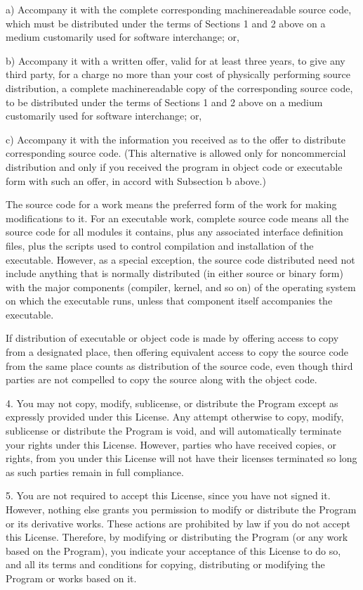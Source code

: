 \documentclass[letterpaper,10pt,english]{sphinxmanual}
\begin{document}
\begin{sphinxVerbatim}[commandchars=\\\{\}]
    a) Accompany it with the complete corresponding machine\PYGZhy{}readable
    source code, which must be distributed under the terms of Sections
    1 and 2 above on a medium customarily used for software interchange; or,

    b) Accompany it with a written offer, valid for at least three
    years, to give any third party, for a charge no more than your
    cost of physically performing source distribution, a complete
    machine\PYGZhy{}readable copy of the corresponding source code, to be
    distributed under the terms of Sections 1 and 2 above on a medium
    customarily used for software interchange; or,

    c) Accompany it with the information you received as to the offer
    to distribute corresponding source code.  (This alternative is
    allowed only for noncommercial distribution and only if you
    received the program in object code or executable form with such
    an offer, in accord with Subsection b above.)

The source code for a work means the preferred form of the work for
making modifications to it.  For an executable work, complete source
code means all the source code for all modules it contains, plus any
associated interface definition files, plus the scripts used to
control compilation and installation of the executable.  However, as a
special exception, the source code distributed need not include
anything that is normally distributed (in either source or binary
form) with the major components (compiler, kernel, and so on) of the
operating system on which the executable runs, unless that component
itself accompanies the executable.

If distribution of executable or object code is made by offering
access to copy from a designated place, then offering equivalent
access to copy the source code from the same place counts as
distribution of the source code, even though third parties are not
compelled to copy the source along with the object code.

  4. You may not copy, modify, sublicense, or distribute the Program
except as expressly provided under this License.  Any attempt
otherwise to copy, modify, sublicense or distribute the Program is
void, and will automatically terminate your rights under this License.
However, parties who have received copies, or rights, from you under
this License will not have their licenses terminated so long as such
parties remain in full compliance.

  5. You are not required to accept this License, since you have not
signed it.  However, nothing else grants you permission to modify or
distribute the Program or its derivative works.  These actions are
prohibited by law if you do not accept this License.  Therefore, by
modifying or distributing the Program (or any work based on the
Program), you indicate your acceptance of this License to do so, and
all its terms and conditions for copying, distributing or modifying
the Program or works based on it.


\end{sphinxVerbatim}
\end{document}
